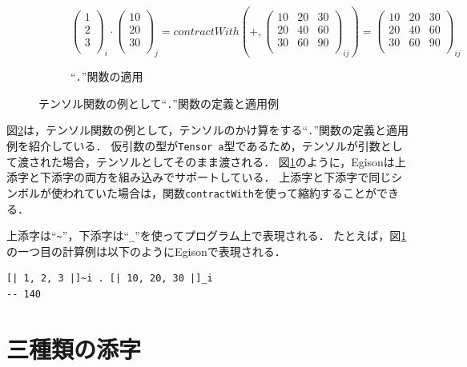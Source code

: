 \begin{figure}[t]
\begin{subfigure}[b]{1.0\linewidth}
{  \\ \medskip \\
  $\begin{pmatrix} 1 \\ 2 \\ 3 \\ \end{pmatrix}_{i} \cdot \begin{pmatrix} 10 \\ 20 \\ 30 \\ \end{pmatrix}_{j} = contractWith(+, \begin{pmatrix} 10 & 20 & 30 \\ 20 & 40 & 60 \\ 30 & 60 & 90 \\ \end{pmatrix}_{ij})
  = \begin{pmatrix} 10 & 20 & 30 \\ 20 & 40 & 60 \\ 30 & 60 & 90 \\ \end{pmatrix}_{ij}$ \\
  }
  \caption{``\lstinline{.}''関数の適用}
  \label{fig:dotApp}
 \end{subfigure}
 \caption{テンソル関数の例として``\lstinline{.}''関数の定義と適用例}
 \label{fig:dotFunction}
\end{figure}

図\ref{fig:dotFunction}は，テンソル関数の例として，テンソルのかけ算をする``\lstinline{.}''関数の定義と適用例を紹介している．
仮引数の型が\lstinline{Tensor a}型であるため，テンソルが引数として渡された場合，テンソルとしてそのまま渡される．
図\ref{fig:dotApp}のように，Egisonは上添字と下添字の両方を組み込みでサポートしている．
上添字と下添字で同じシンボルが使われていた場合は，関数\lstinline{contractWith}を使って縮約することができる．

上添字は``\lstinline|~|''，下添字は``\lstinline|_|''を使ってプログラム上で表現される．
たとえば，図\ref{fig:dotApp}の一つ目の計算例は以下のようにEgisonで表現される．
\begin{lstlisting}[language=egison,numbers=none]
[| 1, 2, 3 |]~i . [| 10, 20, 30 |]_i
-- 140
\end{lstlisting}

\section{三種類の添字}\label{tensor-index}

